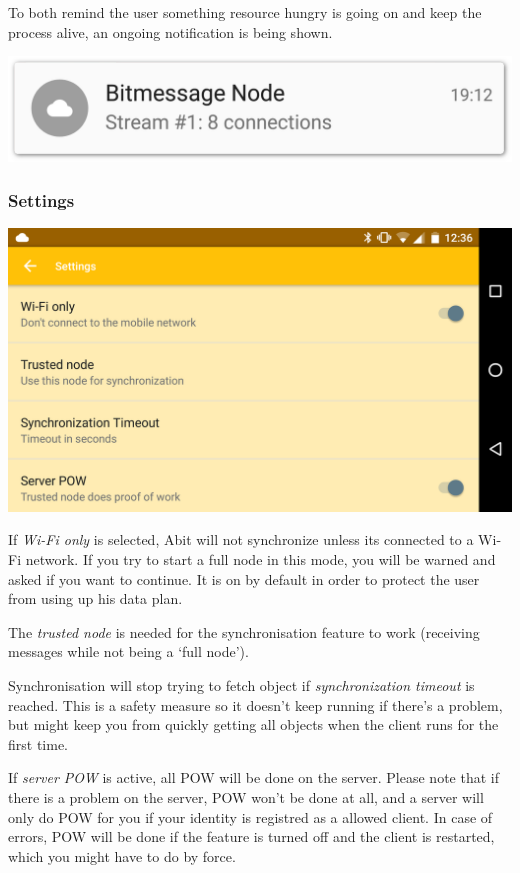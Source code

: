\documentclass{bfh}
\begin{document}
  To both remind the user something resource hungry is going on and keep the process alive, an ongoing notification is being shown.

  \begin{center}
    \includegraphics[width=0.4 \textwidth]{images/screenshot_notification_full_node.png}
  \end{center}

  \subsubsection{Settings}

  \begin{center}
    \includegraphics[width=0.8 \textwidth]{images/screenshot_settings.png}
  \end{center}

  If \textit{Wi-Fi only} is selected, Abit will not synchronize unless its connected to a Wi-Fi network. If you try to start a full node in this mode, you will be warned and asked if you want to continue. It is on by default in order to protect the user from using up his data plan.

  The \textit{trusted node} is needed for the synchronisation feature to work (receiving messages while not being a `full node').

  Synchronisation will stop trying to fetch object if \textit{synchronization timeout} is reached. This is a safety measure so it doesn't keep running if there's a problem, but might keep you from quickly getting all objects when the client runs for the first time.

  If \textit{server POW} is active, all \ac{POW} will be done on the server. Please note that if there is a problem on the server, \ac{POW} won't be done at all, and a server will only do \ac{POW} for you if your identity is registred as a allowed client. In case of errors, \ac{POW} will be done if the feature is turned off and the client is restarted, which you might have to do by force.
\end{document}
